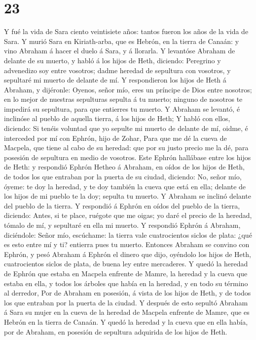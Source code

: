 \hypertarget{section-22}{%
\section{23}\label{section-22}}

 Y fué la vida de Sara ciento veintisiete años: tantos
fueron los años de la vida de Sara.  Y murió Sara en
Kiriath-arba, que es Hebrón, en la tierra de Canaán: y vino Abraham á
hacer el duelo á Sara, y á llorarla.  Y levantóse Abraham
de delante de su muerto, y habló á los hijos de Heth, diciendo:
 Peregrino y advenedizo soy entre vosotros; dadme heredad
de sepultura con vosotros, y sepultaré mi muerto de delante de mí.
 Y respondieron los hijos de Heth á Abraham, y dijéronle:
 Oyenos, señor mío, eres un príncipe de Dios entre
nosotros; en lo mejor de nuestras sepulturas sepulta á tu muerto;
ninguno de nosotros te impedirá su sepultura, para que entierres tu
muerto.  Y Abraham se levantó, é inclinóse al pueblo de
aquella tierra, á los hijos de Heth;  Y habló con ellos,
diciendo: Si tenéis voluntad que yo sepulte mi muerto de delante de mí,
oidme, é interceded por mí con Ephrón, hijo de Zohar, 
Para que me dé la cueva de Macpela, que tiene al cabo de su heredad: que
por su justo precio me la dé, para posesión de sepultura en medio de
vosotros.  Este Ephrón hallábase entre los hijos de Heth:
y respondió Ephrón Hetheo á Abraham, en oídos de los hijos de Heth, de
todos los que entraban por la puerta de su ciudad, diciendo:
 No, señor mío, óyeme: te doy la heredad, y te doy
también la cueva que está en ella; delante de los hijos de mi pueblo te
la doy; sepulta tu muerto.  Y Abraham se inclinó delante
del pueblo de la tierra.  Y respondió á Ephrón en oídos
del pueblo de la tierra, diciendo: Antes, si te place, ruégote que me
oigas; yo daré el precio de la heredad, tómalo de mí, y sepultaré en
ella mi muerto.  Y respondió Ephrón á Abraham,
diciéndole:  Señor mío, escúchame: la tierra vale
cuatrocientos siclos de plata: ¿qué es esto entre mí y ti? entierra pues
tu muerto.  Entonces Abraham se convino con Ephrón, y
pesó Abraham á Ephrón el dinero que dijo, oyéndolo los hijos de Heth,
cuatrocientos siclos de plata, de buena ley entre mercaderes.
 Y quedó la heredad de Ephrón que estaba en Macpela
enfrente de Mamre, la heredad y la cueva que estaba en ella, y todos los
árboles que había en la heredad, y en todo su término al derredor,
 Por de Abraham en posesión, á vista de los hijos de
Heth, y de todos los que entraban por la puerta de la ciudad.
 Y después de esto sepultó Abraham á Sara su mujer en la
cueva de la heredad de Macpela enfrente de Mamre, que es Hebrón en la
tierra de Canaán.  Y quedó la heredad y la cueva que en
ella había, por de Abraham, en posesión de sepultura adquirida de los
hijos de Heth.


